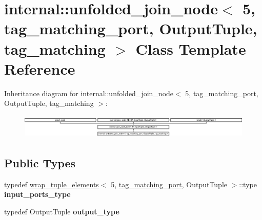 \hypertarget{classinternal_1_1unfolded__join__node_3_015_00_01tag__matching__port_00_01OutputTuple_00_01tag__matching_01_4}{}\section{internal\+:\+:unfolded\+\_\+join\+\_\+node$<$ 5, tag\+\_\+matching\+\_\+port, Output\+Tuple, tag\+\_\+matching $>$ Class Template Reference}
\label{classinternal_1_1unfolded__join__node_3_015_00_01tag__matching__port_00_01OutputTuple_00_01tag__matching_01_4}
Inheritance diagram for internal\+:\+:unfolded\+\_\+join\+\_\+node$<$ 5, tag\+\_\+matching\+\_\+port, Output\+Tuple, tag\+\_\+matching $>$\+:\begin{figure}[H]
\begin{center}
\leavevmode
\includegraphics[height=1.161826cm]{classinternal_1_1unfolded__join__node_3_015_00_01tag__matching__port_00_01OutputTuple_00_01tag__matching_01_4}
\end{center}
\end{figure}
\subsection*{Public Types}
\begin{DoxyCompactItemize}
\item 
\hypertarget{classinternal_1_1unfolded__join__node_3_015_00_01tag__matching__port_00_01OutputTuple_00_01tag__matching_01_4_a8c0e62310ff0ffadd13d5d4c4c0e4005}{}typedef \hyperlink{structinternal_1_1wrap__tuple__elements}{wrap\+\_\+tuple\+\_\+elements}$<$ 5, \hyperlink{classinternal_1_1tag__matching__port}{tag\+\_\+matching\+\_\+port}, Output\+Tuple $>$\+::type {\bfseries input\+\_\+ports\+\_\+type}\label{classinternal_1_1unfolded__join__node_3_015_00_01tag__matching__port_00_01OutputTuple_00_01tag__matching_01_4_a8c0e62310ff0ffadd13d5d4c4c0e4005}

\item 
\hypertarget{classinternal_1_1unfolded__join__node_3_015_00_01tag__matching__port_00_01OutputTuple_00_01tag__matching_01_4_a2e8dd44bb57f6532d77f0ca51d01db84}{}typedef Output\+Tuple {\bfseries output\+\_\+type}\label{classinternal_1_1unfolded__join__node_3_015_00_01tag__matching__port_00_01OutputTuple_00_01tag__matching_01_4_a2e8dd44bb57f6532d77f0ca51d01db84}

\end{DoxyCompactItemize}
